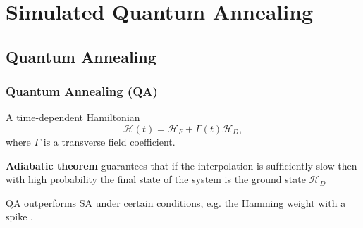 \documentclass[11pt,compress,mathserif]{beamer}
\begin{document}

\section[SQA]{Simulated Quantum Annealing}

\subsection[QA]{Quantum Annealing}

\begin{frame}\frametitle{Quantum Annealing (QA)}
\bit
\item A time-dependent Hamiltonian
$$
\mathcal{H}(t)=\mathcal{H}_{F}+\Gamma(t) \mathcal{H}_{D},
$$
where $\Gamma$ is a transverse field coefficient. 



\item \textbf{Adiabatic theorem} guarantees that if the interpolation is sufﬁciently slow then with high probability the ﬁnal state of the system is the ground state $\mathcal{H}_{D}$

\item QA outperforms SA under certain conditions, e.g. the Hamming weight with a spike \cite{crosson2016simulated}.

\eit


\end{frame}
\end{document}
